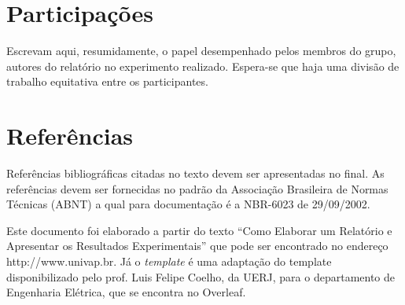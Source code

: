 \documentclass[a4paper]{article}
\begin{document}
\section{Participações}
Escrevam aqui, resumidamente, o papel desempenhado pelos membros do grupo, autores do relatório no experimento realizado. Espera-se que haja uma divisão de trabalho equitativa entre os participantes.

\section{Referências}
Referências bibliográficas citadas no texto devem ser apresentadas no final. As
referências devem ser fornecidas no padrão da Associação Brasileira de Normas Técnicas
(ABNT) a qual para documentação é a NBR-6023 de 29/09/2002.

\vspace{50pt}
\noindent Este documento foi elaborado a partir do texto “Como Elaborar um Relatório e Apresentar os Resultados Experimentais” que pode ser encontrado no endereço http://www.univap.br. Já o \textit{template} é uma adaptação do template disponibilizado pelo prof. Luis Felipe Coelho, da UERJ, para o departamento de Engenharia Elétrica, que se encontra no Overleaf.
\end{document}
